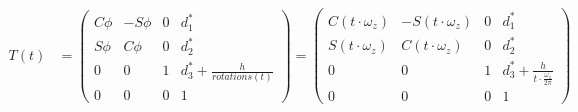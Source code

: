 \begin{align*}
T(t) &= 
\begin{pmatrix}
C\phi & -S\phi & 0 & d_1^*\\
S\phi & C\phi & 0 & d_2^*\\
0 & 0 & 1 & d_3^* + \frac{h}{rotations(t)} \\
0 & 0 & 0 & 1
\end{pmatrix}
=
\begin{pmatrix}
C(t\cdot\omega_z) & -S(t\cdot\omega_z) & 0 & d_1^*\\
S(t\cdot\omega_z) & C(t\cdot\omega_z) & 0 & d_2^*\\
0 & 0 & 1 & d_3^* + \frac{h}{t\cdot\frac{\omega_z}{2\pi}} \\
0 & 0 & 0 & 1
\end{pmatrix}
\end{align*}
